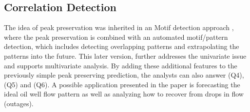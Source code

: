\documentclass[electronic]{vgtc}             %
\begin{document}
\subsection{Correlation Detection\label{subsec:correlation}}
The idea of peak preservation was inherited in an Motif detection approach \cite{Hao:2012}, where the peak preservation is combined with an automated motif/pattern detection, which includes detecting overlapping patterns and extrapolating the patterns into the future.
This later version, further addresses the univariate issue and supports multivariate analysis. 
By adding these additional features to the previously simple peak preserving prediction, the analysts can also answer (Q4), (Q5) and (Q6). 
A possible application presented in the paper is forecasting the ideal oil well flow pattern as well as analyzing how to recover from drops in flow (outages).   




\end{document}
